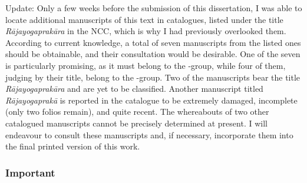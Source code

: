 Update: Only a few weeks before the submission of this dissertation, I was able to locate additional manuscripts of this text in catalogues, listed under the title \textit{Rājayogaprakāra} in the NCC, which is why I had previously overlooked them. According to current knowledge, a total of seven manuscripts from the listed ones should be obtainable, and their consultation would be desirable. One of the seven is particularly promising, as it must belong to the \alpha-group, while four of them, judging by their title, belong to the \beta-group. Two of the manuscripts bear the title \textit{Rājayogaprakāra} and are yet to be classified. Another manuscript titled \textit{Rājayogaprakā} is reported in the catalogue to be extremely damaged, incomplete (only two folios remain), and quite recent. The whereabouts of two other catalogued manuscripts cannot be precisely determined at present. I will endeavour to consult these manuscripts and, if necessary, incorporate them into the final printed version of this work.

\subsubsection{Important}

